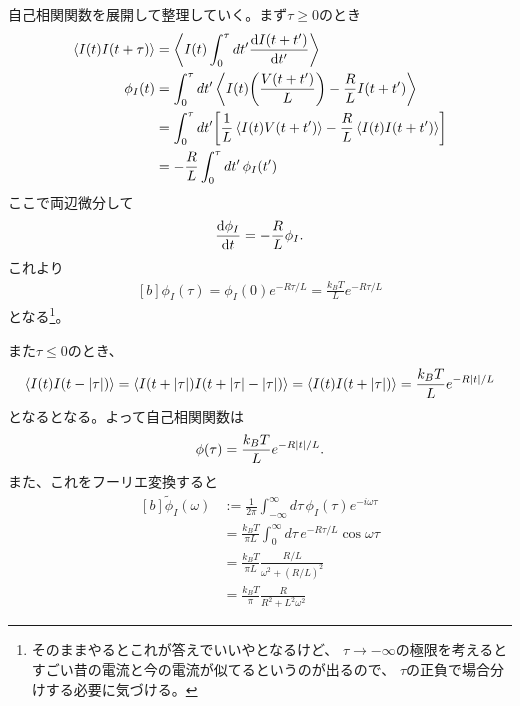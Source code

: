 \documentclass[../../master.tex]{subfiles}
\begin{document}
\subsection{}
自己相関関数を展開して整理していく。まず\(\tau\ge 0\)のとき
\begin{equation}\begin{aligned}[b]
    \ev{I(t)I(t+\tau)}
    &= \ev{I(t)\int_{0}^{\tau}dt'\dv{I(t+t')}{t'}}\\
    \phi_I(t)&= \int_{0}^{\tau}dt'\ev{I(t)\qty(\frac{V(t+t')}{L})-\frac{R}{L}I(t+t')}\\
    &= \int_{0}^{\tau}dt'\qty[\frac{1}{L}\ev{I(t)V(t+t')}-\frac{R}{L}\ev{I(t)I(t+t')}]\\
    &= -\frac{R}{L}\int_{0}^{\tau}dt'\,\phi_I(t')
\end{aligned}\end{equation}
ここで両辺微分して
\begin{equation}\begin{aligned}[b]
    \dv{\phi_I}{t} = -\frac{R}{L}\phi_I.
\end{aligned}\end{equation}
これより
\begin{equation}\begin{aligned}[b]
    \phi_I(\tau) = \phi_I(0)e^{-R\tau/L} = \frac{k_B T}{L}e^{-R\tau/L}
\end{aligned}\end{equation}
となる\footnote{そのままやるとこれが答えでいいやとなるけど、
\(\tau\to-\infty\)の極限を考えるとすごい昔の電流と今の電流が似てるというのが出るので、
\(\tau\)の正負で場合分けする必要に気づける。}。

また\(\tau\le 0\)のとき、
\begin{equation}\begin{aligned}[b]
    \ev{I(t)I(t-\abs{\tau})}
    = \ev{I(t+\abs{\tau})I(t+\abs{\tau}-\abs{\tau})}
    = \ev{I(t)I(t+\abs{\tau})} = \frac{k_B T}{L}e^{-R\abs{t}/L}
\end{aligned}\end{equation}
となるとなる。よって自己相関関数は
\begin{equation}\begin{aligned}[b]
    \phi(\tau) = \frac{k_B T}{L}e^{-R\abs{t}/L}.
\end{aligned}\end{equation}
また、これをフーリエ変換すると
\begin{equation}\begin{aligned}[b]
    \tilde{\phi}_I(\omega) &:=
    \frac{1}{2\pi}\int_{-\infty}^{\infty}d\tau\,\phi_I(\tau)e^{-i\omega\tau}\\
    &= \frac{k_BT}{\pi L}\int_{0}^{\infty} d\tau\, e^{-R\tau/L}\cos \omega \tau\\
    &= \frac{k_BT}{\pi L} \frac{R/L}{\omega^2 + (R/L)^2}\\
    &= \frac{k_BT}{\pi} \frac{R}{R^2+L^2\omega^2}
\end{aligned}\end{equation}
\end{document}

